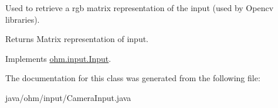 Used to retrieve a rgb matrix representation of the input (used by Opencv libraries). \begin{DoxyReturn}{Returns}
Matrix representation of input. 
\end{DoxyReturn}


Implements \hyperlink{interfaceohm_1_1input_1_1_input_ac9877f2cacdb85c06af084fd426495fd}{ohm.\+input.\+Input}.



The documentation for this class was generated from the following file\+:\begin{DoxyCompactItemize}
\item 
java/ohm/input/Camera\+Input.\+java\end{DoxyCompactItemize}
